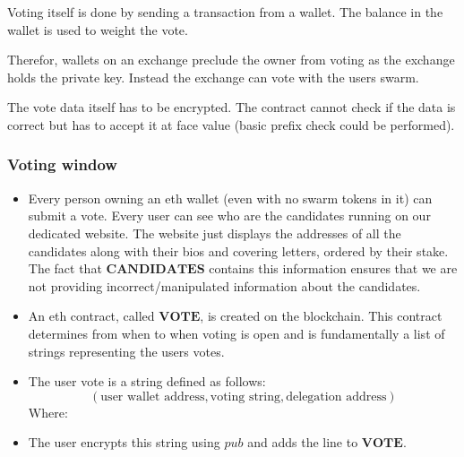 \documentclass[submission, copyright,creativecommons,sharealike,noncommercial]{eptcs}
\begin{document}
			Voting itself is done by sending a transaction from a
			wallet. The balance in the wallet is used to weight the
			vote.

			Therefor, wallets on an exchange preclude the owner from
			voting as the exchange holds the private key. Instead the
			exchange can vote with the users swarm.

			The vote data itself has to be encrypted. The contract
			cannot check if the data is correct but has to accept
			it at face value (basic prefix check could be performed).

		\subsubsection{Voting window}
			\begin{itemize}
				\item Every person owning an eth wallet (even with no swarm tokens in it) can submit a vote. Every user can see who are the candidates running on our dedicated website. The website just displays the addresses of all the candidates along with their bios and covering letters, ordered by their stake. The fact that $\textbf{CANDIDATES}$ contains this information ensures that we are not providing incorrect/manipulated information about the candidates.
				
				\item An eth contract, called $\textbf{VOTE}$, is created on the blockchain. This contract determines from when to when voting is open and is fundamentally a list of strings representing the users votes.
				
				\item The user vote is a string defined as follows: 
				\[
				(\text{user wallet address}, \text{voting string}, \text{delegation address})
				\]
				Where:
			
				\item The user encrypts this string using $pub$ and adds the line to $\textbf{VOTE}$.
			\end{itemize}
		
\end{document}
